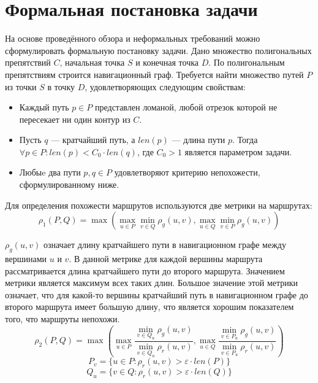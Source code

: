 \FloatBarrier

\section{Формальная постановка задачи}

На основе проведённого обзора и неформальных требований можно
сформулировать формальную постановку задачи. Дано множество
полигональных препятствий $C$, начальная точка $S$ и конечная точка
$D$. По полигональным препятствиям строится навигационный граф.
Требуется найти множество путей $P$ из точки $S$ в точку $D$,
удовлетворяющих следующим свойствам:
\begin{itemize}
  \item Каждый путь $p \in P$ представлен ломаной, любой отрезок
    которой не пересекает ни один контур из $C$.
  \item Пусть $q$ --- кратчайший путь, а $len(p)$ --- длина пути $p$.
    Тогда $\forall p \in P: len(p) < C_0 \cdot len(q)$, где $C_0 > 1$
    является параметром задачи.
  \item Любыe два пути $p, q \in P$ удовлетворяют критерию
    непохожести, сформулированному ниже.
\end{itemize}

Для определения похожести маршрутов используются две метрики на
маршрутах:
\begin{equation*}
    \rho_1 (P, Q) = \max(\max_{u \in P} \min_{v \in Q} \rho_g(u,
    v), \max_{u \in Q} \min_{v \in P} \rho_g(u, v))
\end{equation*}

$\rho_g(u, v)$ означает длину кратчайшего пути в навигационном графе
между вершинами $u$ и $v$. В данной метрике для каждой вершины
маршрута рассматривается длина кратчайшего пути до второго маршрута.
Значением метрики является максимум всех таких длин. Большое значение
этой метрики означает, что для какой-то вершины кратчайший путь в
навигационном графе до второго маршрута имеет большую длину, что
является хорошим показателем того, что маршруты непохожи.
\begin{equation*}
    \rho_2 (P, Q) = \max(\max_{u \in P} \frac{\min\limits_{v \in Q_u}
    \rho_g(u, v)}{\min\limits_{v \in Q_u} \rho_r(u, v)}, \max\limits_{u \in Q} \frac{\min\limits_{v \in P_u}
    \rho_g(u, v)}{\min\limits_{v \in P_u} \rho_r(u, v)})
\end{equation*}
\begin{equation*}
    P_v = \{ u \in P : \rho_r(u, v) > \varepsilon \cdot len(P) \}
\end{equation*}
\begin{equation*}
    Q_u = \{ v \in Q : \rho_r(u, v) > \varepsilon \cdot len(Q) \}
\end{equation*}

